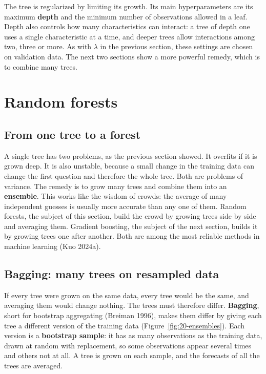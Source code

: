 The tree is regularized by limiting its growth. Its main hyperparameters are its maximum \textbf{depth} and the minimum number of observations allowed in a leaf. Depth also controls how many characteristics can interact: a tree of depth one uses a single characteristic at a time, and deeper trees allow interactions among two, three or more. As with $\lambda$ in the previous section, these settings are chosen on validation data. The next two sections show a more powerful remedy, which is to combine many trees.

\section{Random forests}
\label{sec:20-rf}

\subsection{From one tree to a forest}

A single tree has two problems, as the previous section showed. It overfits if it is grown deep. It is also unstable, because a small change in the training data can change the first question and therefore the whole tree. Both are problems of variance. The remedy is to grow many trees and combine them into an \textbf{ensemble}. This works like the wisdom of crowds: the average of many independent guesses is usually more accurate than any one of them. Random forests, the subject of this section, build the crowd by growing trees side by side and averaging them. Gradient boosting, the subject of the next section, builds it by growing trees one after another. Both are among the most reliable methods in machine learning (Kuo 2024a).

\subsection{Bagging: many trees on resampled data}

If every tree were grown on the same data, every tree would be the same, and averaging them would change nothing. The trees must therefore differ. \textbf{Bagging}, short for bootstrap aggregating (Breiman 1996), makes them differ by giving each tree a different version of the training data (Figure~\ref{fig:20-ensembles}). Each version is a \textbf{bootstrap sample}: it has as many observations as the training data, drawn at random with replacement, so some observations appear several times and others not at all. A tree is grown on each sample, and the forecasts of all the trees are averaged.

